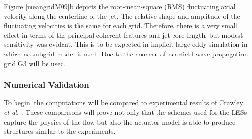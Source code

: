 \documentclass[english]{aiaa-tc}
\begin{document}
Figure \ref{meangridM09}b depicts the root-mean-square (RMS) fluctuating axial velocity along the centerline of the jet. The relative shape and amplitude of the fluctuating velocities is the same for each grid. Therefore, there is a very small
effect in terms of the principal coherent features and jet core
length, but modest sensitivity was evident. This is to be expected in implicit large eddy simulation in which no subgrid model is used. Due to the concern of nearfield wave propogation grid G3 will be used. 


\subsubsection{Numerical Validation}
To begin, the computations will be compared to experimental results of Crawley {\em et al.} \cite{Crawley2014}. These comparisons will prove not only that the schemes used for the LESs capture the physics of the flow but also the actuator model is able to produce structures similar to the experiments.
\end{document}
